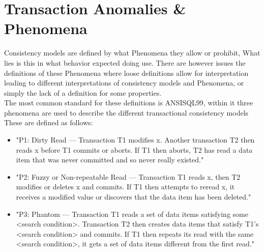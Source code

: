 \documentclass[a4paper,10pt,titlepage]{report}
\begin{document}
\newpage
\section{Transaction Anomalies \& Phenomena}

Consistency models are defined by what Phenomena they allow or prohibit, What lies is this in what behavior expected doing use. There are however issues the definitions of these Phenomena where loose definitions allow for interpretation leading to different interpretations of consistency models and Phenomena, or simply the lack of a definition for some properties.\\

The most common standard for these definitions is ANSISQL99\cite{ansisql1999}, within it three phenomena  are used to describe the different transactional consistency models These are defined as follows:
\begin{itemize}
    \item "P1: Dirty Read — Transaction T1 modifies x. Another transaction T2 then reads x before T1 commits or aborts. If T1 then aborts, T2 has read a data item that was never committed and so never really existed."
    \item "P2: Fuzzy or Non-repeatable Read — Transaction T1 reads x, then T2 modifies or deletes x and commits. If T1 then attempts to reread x, it receives a modified value or discovers that the data item has been deleted."
    \item "P3: Phantom — Transaction T1 reads a set of data items satisfying some <search condition>. Transaction T2 then creates data items that satisfy T1's <search condition> and commits. If T1 then repeats its read with the same <search condition>, it gets a set of data items different from the first read."
\end{itemize}
\end{document}
